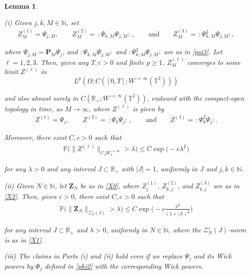 \documentclass[letterpaper, 11pt,  reqno]{amsart}
\newtheorem{lemma}[theorem]{Lemma}
\newcommand{\1}{\hspace{0.5mm}\text{I}\hspace{0.2mm}}
\newcommand{\noi}{\noindent}
\newcommand{\R}{\mathbb{R}}
\newcommand{\T}{\mathbb{T}}
\newcommand{\N}{\mathbb{N}}
\newcommand{\PP}{\mathbb{P}}
\newcommand{\eps}{\varepsilon}
\newcommand{\ld}{\lambda}
\renewcommand{\P}{\mathbf{P}}
\newcommand{\ZZ}{\mathcal{Z}}
\newcommand{\wick}[1]{:\!{#1}\!:}
\renewcommand{\O}{\Omega}
\renewcommand{\l}{\ell}
\numberwithin{equation}{section}
\numberwithin{theorem}{section}
\begin{document}
\begin{lemma}
\label{LEM:sto1}

\textup{(i)}
Given %
$j, k, M \in \N$, set 
\begin{align*}
Z_{M}^{(1)} = \Psi_{j, M},\qquad   Z_{M}^{(2)} = \, \wick{\Psi_{k, M} \Psi_{j, M}} \, , 
\qquad \text{and}\qquad 
Z_{M}^{(3)}
=  \, \wick{\Psi_{k, M}^2 \Psi_{j, M}}, 
\end{align*}



\noi
where 
$\Psi_{j, M} = \P_M \Psi_{j}$, 
and
$ \wick{\Psi_{k, M} \Psi_{j, M}} $
and $ \wick{\Psi_{k, M}^2 \Psi_{j, M}}$
are as in 
\eqref{psi3}.
Let $\l = 1, 2, 3$.
Then, 
given any  $T,\eps>0$ and finite $p \geq 1$, 
$  Z^{(\l)}_M$
converges to some limit $Z^{(\l)}$ in 
\[L^p(\O;C([0,T];W^{-\eps,\infty}(\T^2)))\]

\noi
and also almost surely in $C(\R_+;W^{-\eps,\infty}(\T^2))$, 
endowed with the compact-open topology in time, 
as $M \to \infty$, 
where $Z^{(\l)}$ is given by 
\begin{align*}
Z^{(1)} = \Psi_{j},\qquad   Z^{(2)} = \, \wick{\Psi_{k} \Psi_{j}} \, , 
\qquad \text{and}\qquad 
Z^{(3)}
=  \, \wick{\Psi_{k}^2 \Psi_{j}}.
\end{align*}

\noi
Moreover, there exist
  $C, c > 0$ such that 
\begin{align}
\PP \Big( \| Z^{(\l)} \|_{C_{J} W_x^{- \eps, \infty}} > \ld \Big) 
\leq C \exp\big( - c\ld^{\frac{2}{\l}}\big)
\label{tail1}
\end{align}

\noi
for any $\ld > 0$ and any interval $J \subset \R_+$ with $|J| = 1$, 
uniformly in $J$ and $j, k \in \N$.


\smallskip

\noi
\textup{(ii)}
Given $N \in \N$, 
let $\pmb Z_N$ be as in \eqref{X0}, 
where 
$Z_j^{(1)}$,  $Z_{k, j}^{(2)}$, and $Z_{k, j}^{(3)}$
are as in \eqref{X2}.
Then,  given $\eps > 0$, there exist
  $C, c > 0$ such that 
\begin{align}
\PP \Big( \| \pmb Z_N \|_{\ZZ^\eps_N(J)} > \ld \Big) 
\le C %
  \exp\Big( - c\frac{\ld^\frac{2}{3}}{(1 + |J|)^\frac 23 }\Big)
\label{tail2}
\end{align}



\noi
for any 
interval $J \subset \R_+$
and 
$\ld > 0$,  
uniformly in $N \in \N$, 
where the $\ZZ_N^\eps(J)$-norm is as in \eqref{X1}.





\smallskip

\noi
\textup{(iii)}
The claims in Parts (i) and (ii) hold
even if we replace $\Psi_j$ 
and its  Wick powers
by $\Phi_j$
defined in \eqref{phi2} 
with the corresponding Wick powers.


\end{lemma}
\end{document}
